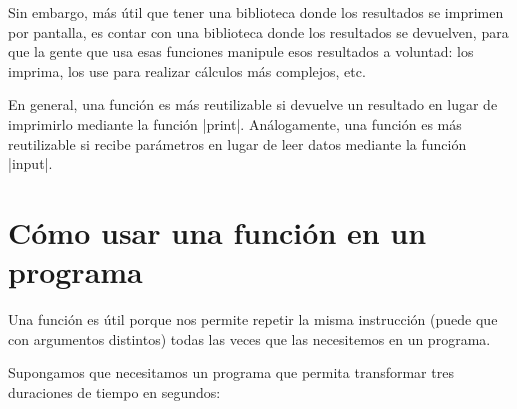 Sin embargo, más útil que tener una biblioteca donde los resultados
se imprimen por pantalla, es contar con una biblioteca donde los
resultados se devuelven, para que la gente que usa esas funciones manipule
esos resultados a voluntad: los imprima, los use para realizar cálculos
más complejos, etc.

\begin{observacion}
En general, una función es más reutilizable si devuelve un resultado en
lugar de imprimirlo mediante la función |print|. Análogamente, una función es
más reutilizable si recibe parámetros en lugar de leer datos mediante la
función |input|.
\end{observacion}





\section{Cómo usar una función en un programa}

Una función es útil porque nos permite repetir la misma
instrucción (puede que con argumentos distintos) todas las veces
que las necesitemos en un programa.

Supongamos que necesitamos un programa que permita transformar tres duraciones
de tiempo en segundos:

